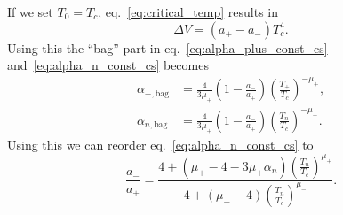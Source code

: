 If we set $T_0 = T_c$, eq.~\eqref{eq:critical_temp} results in
\begin{equation}
\Delta V = (a_+ - a_-) T_c^4.
\end{equation}
Using this the ``bag'' part in eq.~\eqref{eq:alpha_plus_const_cs} and~\eqref{eq:alpha_n_const_cs} becomes
\begin{align}
\alpha_{+,\text{bag}} &= \frac{4}{3 \mu_+} \left( 1 - \frac{a_-}{a_+} \right) \left( \frac{T_+}{T_c} \right)^{-\mu_+}, \\
\alpha_{n,\text{bag}} &= \frac{4}{3 \mu_+} \left( 1 - \frac{a_-}{a_+} \right) \left( \frac{T_n}{T_c} \right)^{-\mu_+}.
\end{align}
Using this we can reorder eq.~\eqref{eq:alpha_n_const_cs} to
\begin{equation}
\frac{a_-}{a_+} = \frac{4 + \left( \mu_+ - 4 - 3 \mu_+ \alpha_n \right) \left(\frac{T_n}{T_c}\right)^{\mu_+}}{4 + \left( \mu_- - 4 \right) \left(\frac{T_n}{T_c}\right)^{\mu_-}}.
\end{equation}
\iffalse
Noting that $T_n < T_c$, this restricts $\alpha_n$ to
\begin{equation}
\alpha_n > \frac{\mu_+ - \mu_-}{3 \mu_+}.
\end{equation}
Even though we have used $T_0 = T_c$ in the intermediate steps, this restriction is general.
\fi

